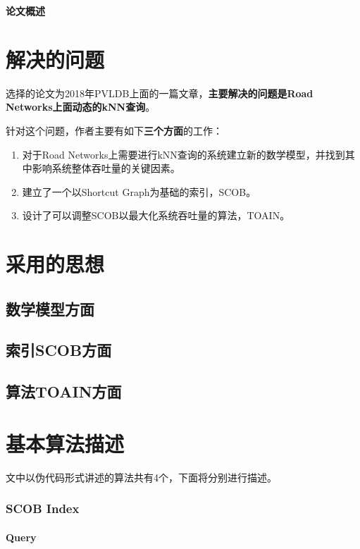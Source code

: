 \documentclass{ML}
\begin{document}
\maketitle

\tableofcontents
\newpage

\begin{center}
    \textbf{ 论文概述}
\end{center}

\section{解决的问题}
选择的论文\cite{toain}为2018年PVLDB上面的一篇文章，\textbf{主要解决的问题是Road Networks上面动态的kNN查询}。

针对这个问题，作者主要有如下\textbf{三个方面}的工作：
\begin{enumerate}
    \item 对于Road Networks上需要进行kNN查询的系统建立新的数学模型，并找到其中影响系统整体吞吐量的关键因素。
    \item 建立了一个以Shortcut Graph为基础的索引，SCOB。
    \item 设计了可以调整SCOB以最大化系统吞吐量的算法，TOAIN。
\end{enumerate}
\section{采用的思想}
\subsection{数学模型方面}
\subsection{索引SCOB方面}
\subsection{算法TOAIN方面}
\section{基本算法描述}
文中以伪代码形式讲述的算法共有4个，下面将分别进行描述。
\subsubsection{SCOB Index}
\paragraph{Query}
\end{document}
